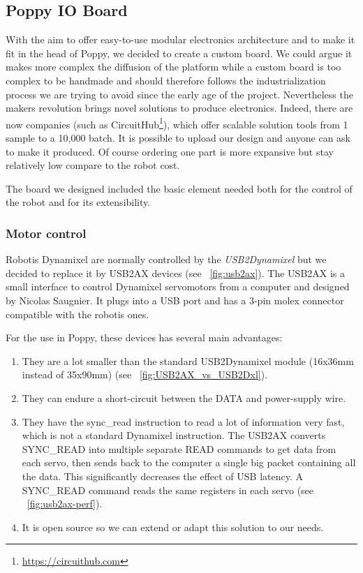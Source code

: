 \subsection{Poppy IO Board} %

With the aim to offer easy-to-use modular electronics architecture and to make it fit in the head of Poppy, we decided to create a custom board. We could argue it makes more complex the diffusion of the platform while a custom board is too complex to be handmade and should therefore follows the industrialization process we are trying to avoid since the early age of the project. Nevertheless the makers revolution brings novel solutions to produce electronics. Indeed, there are now companies (such as CircuitHub\footnote{\url{https://circuithub.com}}), which offer scalable solution tools from 1 sample to a 10,000 batch. It is possible to upload our design and anyone can ask to make it produced. Of course ordering one part is more expansive but stay relatively low compare to the robot cost.

The board we designed included the basic element needed both for the control of the robot and for its extensibility.


\subsubsection{Motor control} %
Robotis Dynamixel are normally controlled by the \emph{USB2Dynamixel} but we decided to replace it by USB2AX devices (see \figurename~\ref{fig:usb2ax}). The USB2AX is a small interface to control Dynamixel servomotors from a computer and designed by Nicolas Saugnier. It plugs into a USB port and has a 3-pin molex connector compatible with the robotis ones.

For the use in Poppy, these devices has several main advantages:
\begin{enumerate}
    \item They are a lot smaller than the standard USB2Dynamixel module (16x36mm instead of 35x90mm) (see \figurename~\ref{fig:USB2AX_vs_USB2Dxl}).
    \item They can endure a short-circuit between the DATA and power-supply wire.
    \item They have the sync\_read instruction to read a lot of information very fast, which is not a standard Dynamixel instruction. The USB2AX converts SYNC\_READ into multiple separate READ commands to get data from each servo, then sends back to the computer a single big packet containing all the data. This significantly decreases the effect of USB latency. A SYNC\_READ command reads the same registers in each servo (see \figurename~\ref{fig:usb2ax-perf}).
    \item It is open source so we can extend or adapt this solution to our needs.
\end{enumerate}

